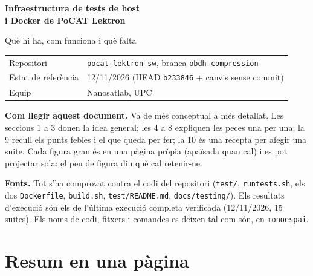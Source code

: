 \documentclass[11pt,a4paper]{article}
\DeclareRobustCommand{\_}{\textunderscore\allowbreak}
\newcommand{\cd}[1]{\texttt{#1}}
\begin{document}
\begin{titlepage}
\centering
\vspace*{2.5cm}
{\Huge\bfseries Infraestructura de tests de host\\[4pt] i Docker de PoCAT Lektron\par}
\vspace{0.8cm}
{\Large Què hi ha, com funciona i què falta\par}
\vspace{1.6cm}
\begin{tabular}{@{}ll@{}}
Repositori & \cd{pocat-lektron-sw}, branca \cd{obdh-compression}\\
Estat de referència & 12/11/2026 (HEAD \cd{b233846} + canvis sense commit)\\
Equip & Nanosatlab, UPC\\
\end{tabular}
\vspace{1.6cm}

\begin{minipage}{0.82\textwidth}
\small
\textbf{Com llegir aquest document.} Va de més conceptual a més detallat. Les
seccions 1 a 3 donen la idea general; les 4 a 8 expliquen les peces una per una;
la 9 recull els punts febles i el que queda per fer; la 10 és una recepta per
afegir una suite. Cada figura gran és en una pàgina pròpia (apaïsada quan cal) i
es pot projectar sola: el peu de figura diu què cal retenir-ne.

\medskip
\textbf{Fonts.} Tot s'ha comprovat contra el codi del repositori (\cd{test/},
\cd{run\_tests.sh}, els dos \cd{Dockerfile}, \cd{build.sh}, \cd{test/README.md},
\cd{docs/testing/}). Els resultats d'execució són els de l'última execució
completa verificada (12/11/2026, 15 suites). Els noms de codi, fitxers i
comandes es deixen tal com són, en \cd{monoespai}.
\end{minipage}
\vfill
\end{titlepage}

\tableofcontents
\clearpage

\section{Resum en una pàgina}
\end{document}
